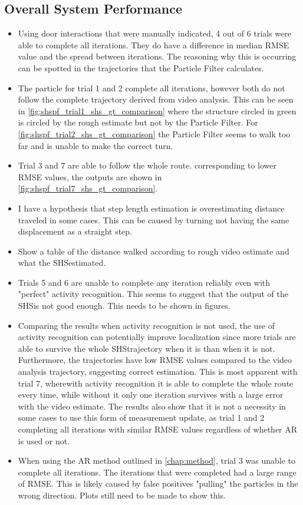 \newpage
\subsection*{Overall System Performance}

\begin{itemize}
	\item Using door interactions that were manually indicated, 4 out of 6 trials were able to complete all iterations. They do have a difference in median RMSE value and the spread between iterations. The reasoning why this is occurring can be spotted in the trajectories that the Particle Filter calculates.  
	\item The particle for trial 1 and 2 complete all iterations, however both do not follow the complete trajectory derived from video analysis. This can be seen in  \cref{fig:shspf_trial1_shs_gt_comparison} where the structure circled in green is circled by the rough estimate but not by the Particle Filter. For \cref{fig:shspf_trial2_shs_gt_comparison} the Particle Filter seems to walk too far and is unable to make the correct turn.
	\item Trial 3 and 7 are able to follow the whole route. corresponding to lower RMSE values, the outputs are shown in \cref{fig:shspf_trial7_shs_gt_comparison}.
	\item I have a hypothesis that step length estimation is overestimating distance traveled in some cases. This can be caused by turning not having the same displacement as a straight step.
	\item Show a table of the distance walked according to rough video estimate and what the \ac{SHS}estimated.
	
	\item Trials 5 and 6 are unable to complete any iteration reliably even with "perfect" activity recognition. This seems to suggest that the output of the \ac{SHS}is not good enough. This needs to be shown in figures.
	
	\item Comparing the results when activity recognition is not used, the use of activity recognition can potentially improve localization since more trials are able to survive the whole \ac{SHS}trajectory when it is than when it is not. Furthermore, the trajectories have low RMSE values compared to the video analysis trajectory, suggesting correct estimation. This is most apparent with trial 7, wherewith activity recognition it is able to complete the whole route every time, while without it only one iteration survives with a large error with the video estimate. The results also show that it is not a necessity in some cases to use this form of measurement update, as trial 1 and 2 completing all iterations with similar RMSE values regardless of whether AR is used or not.
	\item When using the AR method outlined in \cref{chap:method}, trial 3 was unable to complete all iterations. The iterations that were completed had a large range of RMSE. This is likely caused by false positives "pulling" the particles in the wrong direction. Plots still need to be made to show this.
\end{itemize}



